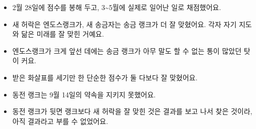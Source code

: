 \begin{learned}
\begin{itemize}
\item 2월 28일에 점수를 봉해 두고, 3\textasciitilde{}5월에 실제로 일어난 일로 채점했어요.
\item 새 허락은 엔도스랭크가, 새 송금자는 송금 랭크가 더 잘 맞혔어요. 각자 자기 지도와 닮은 미래를 잘 맞힌 거예요.
\item 엔도스랭크가 크게 앞선 데에는 송금 랭크가 아무 말도 할 수 없는 통이 많았던 탓이 커요.
\item 받은 화살표를 세기만 한 단순한 점수가 둘 다보다 잘 맞혔어요.
\item 동전 랭크는 9월 14일의 약속을 지키지 못했어요.
\item 동전 랭크가 뒷면 랭크보다 새 허락을 잘 맞힌 것은 결과를 보고 나서 찾은 것이라, 아직 결과라고 부를 수 없었어요.
\end{itemize}
\end{learned}

